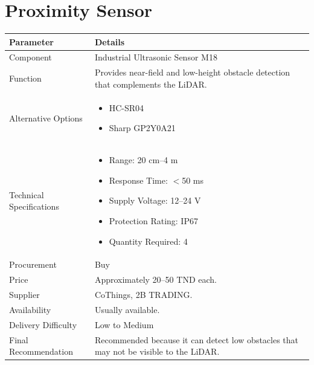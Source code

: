 \documentclass[12pt,a4paper]{article}
\begin{document}
\section{Proximity Sensor}

\begin{longtable}{|p{4cm}|p{10cm}|}
\hline
\textbf{Parameter} & \textbf{Details} \\
\hline

Component &
Industrial Ultrasonic Sensor M18 \\
\hline

Function &
Provides near-field and low-height obstacle detection that complements the LiDAR. \\
\hline


Alternative Options &
\begin{itemize}
\item HC-SR04
\item Sharp GP2Y0A21
\end{itemize}
\\
\hline

Technical Specifications &
\begin{itemize}
\item Range: 20 cm--4 m
\item Response Time: $<$50 ms
\item Supply Voltage: 12--24 V
\item Protection Rating: IP67
\item Quantity Required: 4
\end{itemize}
\\
\hline

Procurement &
Buy \\
\hline

Price &
Approximately 20--50 TND each. \\
\hline

Supplier &
CoThings, 2B TRADING. \\
\hline

Availability &
Usually available. \\
\hline

Delivery Difficulty &
Low to Medium \\
\hline

Final Recommendation &
Recommended because it can detect low obstacles that may not be visible to the LiDAR. \\
\hline

\end{longtable}
\end{document}
